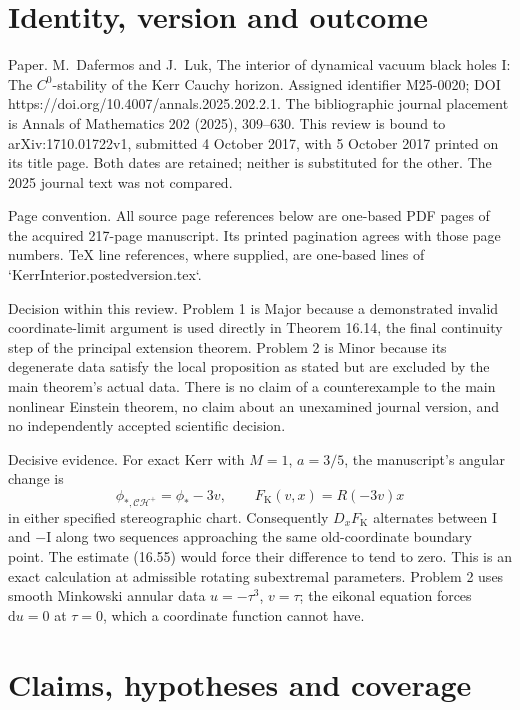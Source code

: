 \documentclass[10pt]{article}
\begin{document}
\section*{Identity, version and outcome}
Paper. M. Dafermos and J. Luk, The interior of dynamical vacuum black holes I: The \(C^0\)-stability of the Kerr Cauchy horizon. Assigned identifier M25-0020; DOI https://doi.org/10.4007/annals.2025.202.2.1. The bibliographic journal placement is Annals of Mathematics 202 (2025), 309–630. This review is bound to arXiv:1710.01722v1, submitted 4 October 2017, with 5 October 2017 printed on its title page. Both dates are retained; neither is substituted for the other. The 2025 journal text was not compared.\par
Page convention. All source page references below are one-based PDF pages of the acquired 217-page manuscript. Its printed pagination agrees with those page numbers. TeX line references, where supplied, are one-based lines of `KerrInterior.postedversion.tex`.\par
Decision within this review. Problem 1 is Major because a demonstrated invalid coordinate-limit argument is used directly in Theorem 16.14, the final continuity step of the principal extension theorem. Problem 2 is Minor because its degenerate data satisfy the local proposition as stated but are excluded by the main theorem’s actual data. There is no claim of a counterexample to the main nonlinear Einstein theorem, no claim about an unexamined journal version, and no independently accepted scientific decision.\par
Decisive evidence. For exact Kerr with \(M=1\), \(a=3/5\), the manuscript’s angular change is \[\phi_{*,\mathcal{CH}^{+}}=\phi_*-3v,\qquad
 F_{\mathrm K}(v,x)=R(-3v)x\] in either specified stereographic chart. Consequently \(D_xF_{\mathrm K}\) alternates between \(\mathrm I\) and \(-\mathrm I\) along two sequences approaching the same old-coordinate boundary point. The estimate (16.55) would force their difference to tend to zero. This is an exact calculation at admissible rotating subextremal parameters. Problem 2 uses smooth Minkowski annular data \(u=-\tau^3\), \(v=\tau\); the eikonal equation forces \(\mathrm du=0\) at \(\tau=0\), which a coordinate function cannot have.\par
\section*{Claims, hypotheses and coverage}
\end{document}
